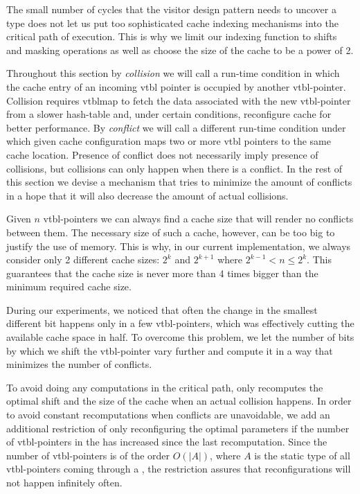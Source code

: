 The small number of cycles that the visitor design pattern needs to uncover a 
type does not let us put too sophisticated cache indexing mechanisms into the 
critical path of execution. This is why we limit our indexing function to shifts 
and masking operations as well as choose the size of the cache to be a power of 2.

Throughout this section by \emph{collision} we will call a run-time condition in 
which the cache entry of an incoming vtbl pointer is occupied by another vtbl-pointer.
Collision requires vtblmap to fetch the data associated with the new 
vtbl-pointer from a slower hash-table and, under certain conditions, reconfigure 
cache for better performance. By \emph{conflict} we will call a different 
run-time condition under which given cache configuration maps two or more vtbl 
pointers to the same cache location. Presence of conflict does not necessarily 
imply presence of collisions, but collisions can only happen when there is a 
conflict. In the rest of this section we devise a mechanism that tries to 
minimize the amount of conflicts in a hope that it will also decrease the amount 
of actual collisions.

Given $n$ vtbl-pointers we can always find a cache size that will render no 
conflicts between them. The necessary size of such a cache, however, can be too 
big to justify the use of memory. This is why, in our current implementation, we 
always consider only 2 different cache sizes: $2^k$ and $2^{k+1}$ where 
$2^{k-1} < n \leq 2^k$. This guarantees that the cache size is never more than 4 
times bigger than the minimum required cache size.

During our experiments, we noticed that often the change in the smallest 
different bit happens only in a few vtbl-pointers, which was effectively 
cutting the available cache space in half. To overcome this problem, we let the 
number of bits by which we shift the vtbl-pointer vary further and compute it in 
a way that minimizes the number of conflicts.

To avoid doing any computations in the critical path,  only 
recomputes the optimal shift and the size of the cache when an actual collision 
happens. In order to avoid constant recomputations when conflicts are unavoidable, 
we add an additional restriction of only reconfiguring the optimal parameters if 
the number of vtbl-pointers in the  has increased since the last 
recomputation. Since the number of vtbl-pointers is of the order $O(|A|)$, where 
$A$ is the static type of all vtbl-pointers coming through a , the 
restriction assures that reconfigurations will not happen infinitely often.


